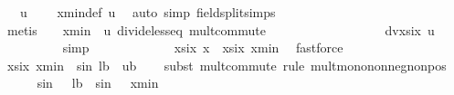 \begin{isabellebody}
\ {\isachardoublequoteopen}{}\ {\isacharslash}{\kern0pt}\ u\ {\isacharless}{\kern0pt}\ {\isasymxi}{\isachardoublequoteclose}\ \isamarkupfalse%
\ xmin{\isacharunderscore}{\kern0pt}def\ u{\isacharparenleft}{\kern0pt}{}{\isacharparenright}{\kern0pt}\ \isamarkupfalse%
\ {\isacharparenleft}{\kern0pt}auto\ simp{\isacharcolon}{\kern0pt}\ field{\isacharunderscore}{\kern0pt}split{\isacharunderscore}{\kern0pt}simps{\isacharparenright}{\kern0pt}\isanewline
\ \ \ \ \ \ \ \ \ \ \isamarkupfalse%
\ {\isacharparenleft}{\kern0pt}metis\ {\isacartoucheopen}{}\ {\isacharless}{\kern0pt}\ {\isasymxi}{\isacartoucheclose}\ {\isacartoucheopen}xmin\ {\isacharless}{\kern0pt}\ u{\isacartoucheclose}\ divide{\isacharunderscore}{\kern0pt}less{\isacharunderscore}{\kern0pt}eq\ mult{\isachardot}{\kern0pt}commute{\isacharparenright}{\kern0pt}\isanewline
\ \ \ \ \ \ \isamarkupfalse%
\isanewline
\ \ \ \ \ \ \isamarkupfalse%
\ \isamarkupfalse%
\ {\isachardoublequoteopen}{}\ {\isacharless}{\kern0pt}\ dvxsix\ u{\isachardoublequoteclose}\isanewline
\ \ \ \ \ \ \ \ \isamarkupfalse%
\ simp\isanewline
\ \ \ \ \isakeywordONE{{\isacharbraceright}{\kern0pt}}\isamarkupfalse%
\isanewline
\ \ \isamarkupfalse%
\isanewline
\ \ \isamarkupfalse%
\ \isamarkupfalse%
\ {\isachardoublequoteopen}xsix\ x\ {\isasymge}\ xsix\ xmin{\isachardoublequoteclose}\ \isamarkupfalse%
\ fastforce\isanewline
\ \ \isamarkupfalse%
\ \isamarkupfalse%
\ {\isachardoublequoteopen}xsix\ xmin\ {\isasymge}\ sin\ {\isacharparenleft}{\kern0pt}{}{\isacharslash}{\kern0pt}lb{\isacharparenright}{\kern0pt}\ {\isacharasterisk}{\kern0pt}\ ub{\isachardoublequoteclose}\isanewline
\ \ \isamarkupfalse%
\ {\isacharparenleft}{\kern0pt}subst\ mult{\isachardot}{\kern0pt}commute{\isacharcomma}{\kern0pt}\ rule\ mult{\isacharunderscore}{\kern0pt}mono{\isacharunderscore}{\kern0pt}nonneg{\isacharunderscore}{\kern0pt}nonpos{\isacharparenright}{\kern0pt}\isanewline
\ \ \ \ \isamarkupfalse%
\ {\isachardoublequoteopen}sin\ {\isacharparenleft}{\kern0pt}{}\ {\isacharslash}{\kern0pt}\ lb{\isacharparenright}{\kern0pt}\ {\isasymle}\ sin\ {\isacharparenleft}{\kern0pt}{}\ {\isacharslash}{\kern0pt}\ xmin{\isacharparenright}{\kern0pt}{\isachardoublequoteclose}\isanewline
\ \ \ \ \isamarkupfalse%

\end{isabellebody}
